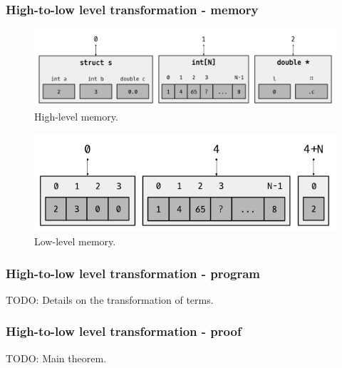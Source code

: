 \begin{frame}[fragile]
\frametitle{High-to-low level transformation - memory}

\begin{center}

\begin{figure}
	\includegraphics[scale=0.31]{images/high_level_memory}
	\caption{High-level memory.}
\end{figure}

\begin{figure}
	\includegraphics[scale=0.31]{images/low_level_memory}
	\caption{Low-level memory.}
\end{figure}

\end{center}

\end{frame}


\begin{frame}[fragile]
\frametitle{High-to-low level transformation - program}

TODO: Details on the transformation of terms.

\end{frame}


\begin{frame}[fragile]
\frametitle{High-to-low level transformation - proof}

TODO: Main theorem.

\end{frame}


